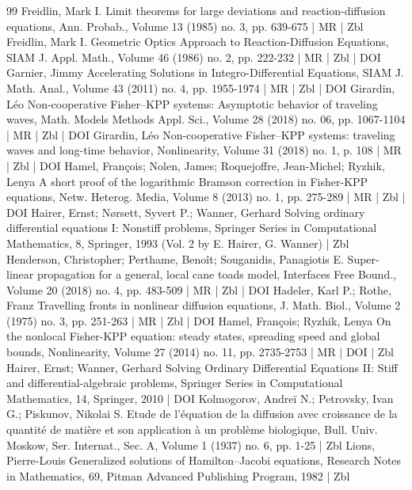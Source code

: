 \begin{thebibliography}{99}
Freidlin, Mark I. Limit theorems for large deviations and reaction-diffusion equations, Ann. Probab., Volume 13 (1985) no. 3, pp. 639-675 | MR | Zbl
Freidlin, Mark I. Geometric Optics Approach to Reaction-Diffusion Equations, SIAM J. Appl. Math., Volume 46 (1986) no. 2, pp. 222-232 | MR | Zbl | DOI
Garnier, Jimmy Accelerating Solutions in Integro-Differential Equations, SIAM J. Math. Anal., Volume 43 (2011) no. 4, pp. 1955-1974 | MR | Zbl | DOI
Girardin, Léo Non-cooperative Fisher–KPP systems: Asymptotic behavior of traveling waves, Math. Models Methods Appl. Sci., Volume 28 (2018) no. 06, pp. 1067-1104 | MR | Zbl | DOI
Girardin, Léo Non-cooperative Fisher–KPP systems: traveling waves and long-time behavior, Nonlinearity, Volume 31 (2018) no. 1, p. 108 | MR | Zbl | DOI
Hamel, François; Nolen, James; Roquejoffre, Jean-Michel; Ryzhik, Lenya A short proof of the logarithmic Bramson correction in Fisher-KPP equations, Netw. Heterog. Media, Volume 8 (2013) no. 1, pp. 275-289 | MR | Zbl | DOI
Hairer, Ernst; Nørsett, Syvert P.; Wanner, Gerhard Solving ordinary differential equations I: Nonstiff problems, Springer Series in Computational Mathematics, 8, Springer, 1993 (Vol. 2 by E. Hairer, G. Wanner) | Zbl
Henderson, Christopher; Perthame, Benoît; Souganidis, Panagiotis E. Super-linear propagation for a general, local cane toads model, Interfaces Free Bound., Volume 20 (2018) no. 4, pp. 483-509 | MR | Zbl | DOI
Hadeler, Karl P.; Rothe, Franz Travelling fronts in nonlinear diffusion equations, J. Math. Biol., Volume 2 (1975) no. 3, pp. 251-263 | MR | Zbl | DOI
Hamel, François; Ryzhik, Lenya On the nonlocal Fisher-KPP equation: steady states, spreading speed and global bounds, Nonlinearity, Volume 27 (2014) no. 11, pp. 2735-2753 | MR | DOI | Zbl
Hairer, Ernst; Wanner, Gerhard Solving Ordinary Differential Equations II: Stiff and differential-algebraic problems, Springer Series in Computational Mathematics, 14, Springer, 2010 | DOI
Kolmogorov, Andreï N.; Petrovsky, Ivan G.; Piskunov, Nikolai S. Etude de l’équation de la diffusion avec croissance de la quantité de matière et son application à un problème biologique, Bull. Univ. Moskow, Ser. Internat., Sec. A, Volume 1 (1937) no. 6, pp. 1-25 | Zbl
Lions, Pierre-Louis Generalized solutions of Hamilton–Jacobi equations, Research Notes in Mathematics, 69, Pitman Advanced Publishing Program, 1982 | Zbl

\end{thebibliography}
